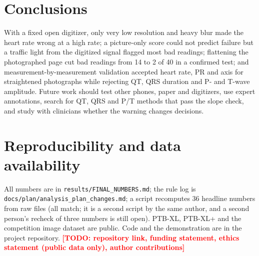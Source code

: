 \documentclass[11pt,a4paper]{article}
\newcommand{\todo}[1]{\textcolor{red}{\textbf{[TODO: #1]}}}
\begin{document}
\section{Conclusions}
With a fixed open digitizer, only very low resolution and heavy blur made the heart rate wrong at a high rate; a picture-only score could not predict failure but a traffic light from the digitized signal flagged most bad readings; flattening the photographed page cut bad readings from 14 to 2 of 40 in a confirmed test; and measurement-by-measurement validation accepted heart rate, PR and axis for straightened photographs while rejecting QT, QRS duration and P- and T-wave amplitude. Future work should test other phones, paper and digitizers, use expert annotations, search for QT, QRS and P/T methods that pass the slope check, and study with clinicians whether the warning changes decisions.

\section*{Reproducibility and data availability}
All numbers are in \texttt{results/FINAL\_NUMBERS.md}; the rule log is \texttt{docs/plan/analysis\_plan\_changes.md}; a script recomputes 36 headline numbers from raw files (all match; it is a second script by the same author, and a second person's recheck of three numbers is still open). PTB-XL, PTB-XL+ and the competition image dataset are public. Code and the demonstration are in the project repository. \todo{repository link, funding statement, ethics statement (public data only), author contributions}



\end{document}
